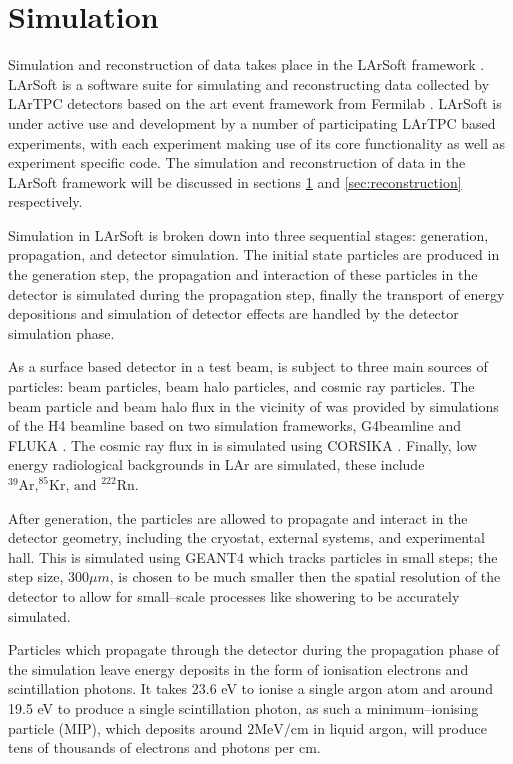 \section{Simulation} \label{sec:simulation}

Simulation and reconstruction of \protodune{} data takes place in the LArSoft
framework \cite{Snider2017}. LArSoft is a software suite for simulating and
reconstructing data collected by LArTPC detectors based on the art event 
framework from Fermilab \cite{Green:2012gv}. LArSoft is under active use and
development by a number of participating LArTPC based experiments, with each
experiment making use of its core functionality as well as experiment specific
code. The simulation and reconstruction of \protodune{} data in the LArSoft
framework will be discussed in sections \ref{sec:simulation} and
\ref{sec:reconstruction} respectively.

Simulation in LArSoft is broken down into three sequential stages: generation,
propagation, and detector simulation. The initial state particles are produced
in the generation step, the propagation and interaction of these particles in
the detector is simulated during the propagation step, finally the transport of 
energy depositions and simulation of detector effects are handled by the
detector simulation phase.

As a surface based detector in a test beam, \protodune{} is subject to three
main sources of particles: beam particles, beam halo particles, and cosmic ray
particles. The beam particle and beam halo flux in the vicinity of 
\protodune{} was provided by simulations of the H4 beamline 
\cite{Booth:2019brj} based on two simulation frameworks, G4beamline 
\cite{g4beamline} and FLUKA \cite{BOHLEN2014211}. The cosmic ray flux in
\protodune{} is simulated using CORSIKA \cite{Heck:1998vt}. Finally, low energy 
radiological backgrounds in LAr are simulated, these include $^{39}\mbox{Ar,} ^
{85}\mbox{Kr, and } ^{222}\mbox{Rn}$.

After generation, the particles are allowed to propagate and interact in the 
detector geometry, including the cryostat, external systems, and experimental
hall. This is simulated using GEANT4 \cite{Agostinelli:2002hh} which tracks 
particles in small steps; the step size, $300 \mu m$, is chosen to be much 
smaller then the spatial resolution of the detector to allow for small--scale 
processes like showering to be accurately simulated. 

Particles which propagate through the detector during the propagation phase of
the simulation leave energy deposits in the form of ionisation electrons and
scintillation photons. It takes 23.6 eV to ionise a single argon atom and 
around 19.5 eV to produce a single scintillation photon, as such a 
minimum--ionising particle (MIP), which deposits around $2 \mbox{MeV/cm}$ 
in liquid argon, will produce tens of thousands of electrons and photons per cm.

